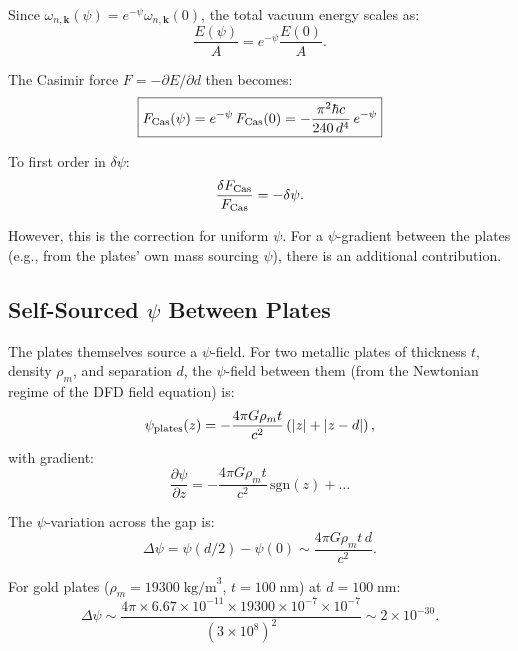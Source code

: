 \documentclass[aps,prb,twocolumn,superscriptaddress,floatfix,nofootinbib,longbibliography]{revtex4-2}
\begin{document}
Since $\omega_{n,\mathbf{k}}(\psi) = e^{-\psi}\omega_{n,\mathbf{k}}(0)$,
the total vacuum energy scales as:
\begin{equation}
\frac{E(\psi)}{A} = e^{-\psi}\frac{E(0)}{A}.
\label{eq:E-psi}
\end{equation}

The Casimir force $F = -\partial E/\partial d$ then becomes:
\begin{equation}
\boxed{
F_{\rm Cas}(\psi) = e^{-\psi}\,F_{\rm Cas}(0)
= -\frac{\pi^2\hbar c}{240\,d^4}\,e^{-\psi}
}
\label{eq:casimir-psi}
\end{equation}

To first order in $\delta\psi$:
\begin{equation}
\frac{\delta F_{\rm Cas}}{F_{\rm Cas}} = -\delta\psi.
\label{eq:casimir-shift}
\end{equation}

However, this is the correction for uniform $\psi$.  For a
$\psi$-gradient between the plates (e.g., from the plates' own mass
sourcing $\psi$), there is an additional contribution.

\subsection{Self-Sourced $\psi$ Between Plates}

The plates themselves source a $\psi$-field.  For two metallic plates of
thickness $t$, density $\rho_m$, and separation $d$, the $\psi$-field
between them (from the Newtonian regime of the DFD field equation) is:
\begin{equation}
\psi_{\rm plates}(z) = -\frac{4\pi G\rho_m t}{c^2}\left(
|z| + |z - d|\right),
\label{eq:psi-plates}
\end{equation}
with gradient:
\begin{equation}
\frac{\partial\psi}{\partial z} = -\frac{4\pi G\rho_m t}{c^2}
\,\text{sgn}(z) + \ldots
\label{eq:psi-grad-plates}
\end{equation}

The $\psi$-variation across the gap is:
\begin{equation}
\Delta\psi = \psi(d/2) - \psi(0) \sim \frac{4\pi G\rho_m t\,d}{c^2}.
\label{eq:delta-psi-gap}
\end{equation}

For gold plates ($\rho_m = 19300\;\text{kg/m}^3$,
$t = 100\;\text{nm}$) at $d = 100\;\text{nm}$:
\begin{equation}
\Delta\psi \sim \frac{4\pi \times 6.67\times 10^{-11}
\times 19300 \times 10^{-7} \times 10^{-7}}{(3\times 10^8)^2}
\sim 2 \times 10^{-30}.
\label{eq:delta-psi-num}
\end{equation}
\end{document}
